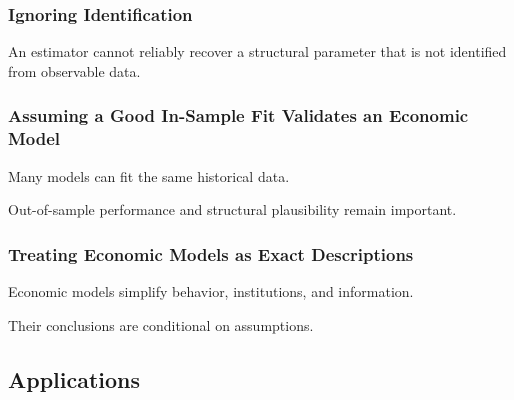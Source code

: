 \subsubsection{Ignoring Identification}

An estimator cannot reliably recover a structural parameter that is not
identified from observable data.

\subsubsection{Assuming a Good In-Sample Fit Validates an Economic Model}

Many models can fit the same historical data.

Out-of-sample performance and structural plausibility remain important.

\subsubsection{Treating Economic Models as Exact Descriptions}

Economic models simplify behavior, institutions, and information.

Their conclusions are conditional on assumptions.

\subsection{Applications}
\label{subsec:mathematical-economics-applications}

